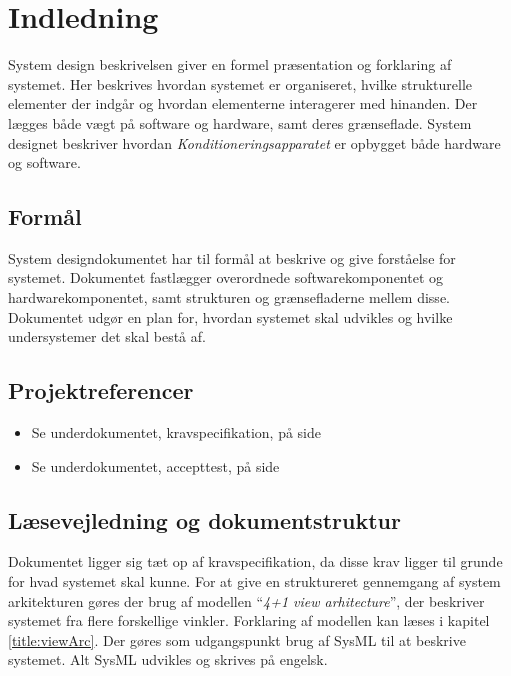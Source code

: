 	\chapter{Indledning}
	System design beskrivelsen giver en formel præsentation og forklaring af systemet. Her beskrives hvordan systemet er organiseret, hvilke strukturelle elementer der indgår og hvordan elementerne interagerer med hinanden. Der lægges både vægt på software og hardware, samt deres grænseflade. System designet beskriver hvordan \textit{Konditioneringsapparatet} er opbygget både hardware og software.
	
	\section{Formål}
	System designdokumentet har til formål at beskrive og give forståelse for systemet. Dokumentet fastlægger overordnede softwarekomponentet og hardwarekomponentet, samt strukturen og grænsefladerne mellem disse. Dokumentet udgør en plan for, hvordan systemet skal udvikles og hvilke undersystemer det skal bestå af. 
	
	\section{Projektreferencer}
	\begin{itemize}
		\item Se underdokumentet, kravspecifikation, på side \pageref{part:ks}
		\item Se underdokumentet, accepttest, på side \pageref{part:at}
	\end{itemize}
	
	\section{Læsevejledning og dokumentstruktur}
	Dokumentet ligger sig tæt op af kravspecifikation, da disse krav ligger til grunde for hvad systemet skal kunne. For at give en struktureret gennemgang af system arkitekturen gøres der brug af modellen “\textit{4+1 view arhitecture}”, der beskriver systemet fra flere forskellige vinkler. Forklaring af modellen kan læses i kapitel \ref{title:viewArc}. Der gøres som udgangspunkt brug af SysML til at beskrive systemet. Alt SysML udvikles og skrives på engelsk. 

